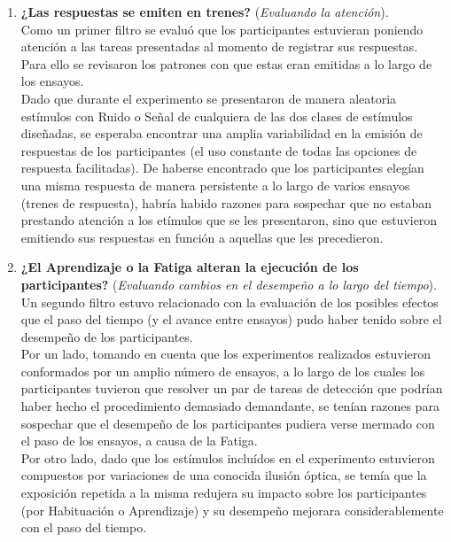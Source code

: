 \begin{enumerate}
\item \textbf{¿Las respuestas se emiten en trenes?} (\textit{Evaluando la atención}).\\

Como un primer filtro se evaluó que los participantes estuvieran poniendo atención a las tareas presentadas al momento de registrar sus respuestas. Para ello se revisaron los patrones con que estas eran emitidas a lo largo de los ensayos.\\

Dado que durante el experimento se presentaron de manera aleatoria estímulos con Ruido o Señal de cualquiera de las dos clases de estímulos diseñadas, se esperaba encontrar una amplia variabilidad en la emisión de respuestas de los participantes (el uso constante de todas las opciones de respuesta facilitadas). De haberse encontrado que los participantes elegían una misma respuesta de manera persistente a lo largo de varios ensayos (trenes de respuesta), habría habido razones para sospechar que no estaban prestando atención a los etímulos que se les presentaron, sino que estuvieron emitiendo sus respuestas en función a aquellas que les precedieron.\\

\item \textbf{¿El Aprendizaje o la Fatiga alteran la ejecución de los participantes?}  (\textit{Evaluando cambios en el desempeño a lo largo del tiempo}).\\

Un segundo filtro estuvo relacionado con la evaluación de los posibles efectos que el paso del tiempo (y el avance entre ensayos) pudo haber tenido sobre el desempeño de los participantes.\\

Por un lado, tomando en cuenta que los experimentos realizados estuvieron conformados por un amplio número de ensayos, a lo largo de los cuales los participantes tuvieron que resolver un par de tareas de detección que podrían haber hecho el procedimiento demasiado demandante, se tenían razones para sospechar que el desempeño de los participantes pudiera verse mermado con el paso de los ensayos, a causa de la Fatiga.\\

Por otro lado, dado que los estímulos incluídos en el experimento estuvieron compuestos por variaciones de una conocida ilusión óptica, se temía que la exposición repetida a la misma redujera su impacto sobre los participantes (por Habituación o Aprendizaje) y su desempeño mejorara considerablemente con el paso del tiempo.\\


\end{enumerate}
